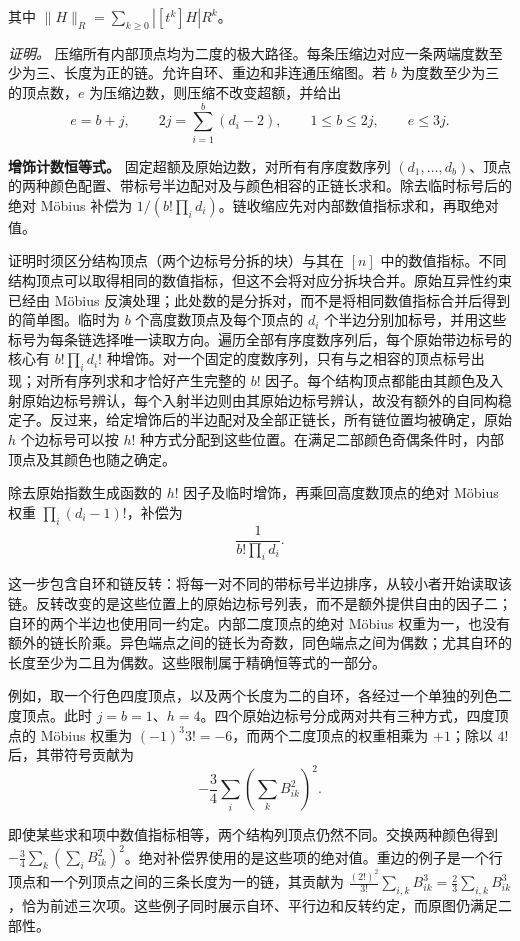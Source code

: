 \documentclass[11pt,a4paper]{article}
\begin{document}
其中 \(\|H\|_R=\sum_{k\ge0}|[t^k]H|R^k\)。

\emph{证明。} 压缩所有内部顶点均为二度的极大路径。每条压缩边对应一条两端度数至少为三、长度为正的链。允许自环、重边和非连通压缩图。若 \(b\) 为度数至少为三的顶点数，\(e\) 为压缩边数，则压缩不改变超额，并给出
\[e=b+j,\qquad
2j=\sum_{i=1}^b(d_i-2),\qquad
1\le b\le2j,\qquad e\le3j.\]

\textbf{增饰计数恒等式。} 固定超额及原始边数，对所有有序度数序列 \((d_1,\ldots,d_b)\)、顶点的两种颜色配置、带标号半边配对及与颜色相容的正链长求和。除去临时标号后的绝对 Möbius 补偿为 \(1/(b!\prod_i d_i)\)。链收缩应先对内部数值指标求和，再取绝对值。

证明时须区分结构顶点（两个边标号分拆的块）与其在 \([n]\) 中的数值指标。不同结构顶点可以取得相同的数值指标，但这不会将对应分拆块合并。原始互异性约束已经由 Möbius 反演处理；此处数的是分拆对，而不是将相同数值指标合并后得到的简单图。临时为 \(b\) 个高度数顶点及每个顶点的 \(d_i\) 个半边分别加标号，并用这些标号为每条链选择唯一读取方向。遍历全部有序度数序列后，每个原始带边标号的核心有 \(b!\prod_i d_i!\) 种增饰。对一个固定的度数序列，只有与之相容的顶点标号出现；对所有序列求和才恰好产生完整的 \(b!\) 因子。每个结构顶点都能由其颜色及入射原始边标号辨认，每个入射半边则由其原始边标号辨认，故没有额外的自同构稳定子。反过来，给定增饰后的半边配对及全部正链长，所有链位置均被确定，原始 \(h\) 个边标号可以按 \(h!\) 种方式分配到这些位置。在满足二部颜色奇偶条件时，内部顶点及其颜色也随之确定。

除去原始指数生成函数的 \(h!\) 因子及临时增饰，再乘回高度数顶点的绝对 Möbius 权重 \(\prod_i(d_i-1)!\)，补偿为
\[\frac1{b!\prod_i d_i}.\]

这一步包含自环和链反转：将每一对不同的带标号半边排序，从较小者开始读取该链。反转改变的是这些位置上的原始边标号列表，而不是额外提供自由的因子二；自环的两个半边也使用同一约定。内部二度顶点的绝对 Möbius 权重为一，也没有额外的链长阶乘。异色端点之间的链长为奇数，同色端点之间为偶数；尤其自环的长度至少为二且为偶数。这些限制属于精确恒等式的一部分。

例如，取一个行色四度顶点，以及两个长度为二的自环，各经过一个单独的列色二度顶点。此时 \(j=b=1\)、\(h=4\)。四个原始边标号分成两对共有三种方式，四度顶点的 Möbius 权重为 \((-1)^3 3!=-6\)，而两个二度顶点的权重相乘为 \(+1\)；除以 \(4!\) 后，其带符号贡献为
\[-\frac34\sum_i\left(\sum_k B_{ik}^2\right)^2.\]

即使某些求和项中数值指标相等，两个结构列顶点仍然不同。交换两种颜色得到 \(-\tfrac34\sum_k(\sum_i B_{ik}^2)^2\)。绝对补偿界使用的是这些项的绝对值。重边的例子是一个行顶点和一个列顶点之间的三条长度为一的链，其贡献为 \(\tfrac{(2!)^2}{3!}\sum_{i,k}B_{ik}^3=\tfrac23\sum_{i,k}B_{ik}^3\)，恰为前述三次项。这些例子同时展示自环、平行边和反转约定，而原图仍满足二部性。
\end{document}
